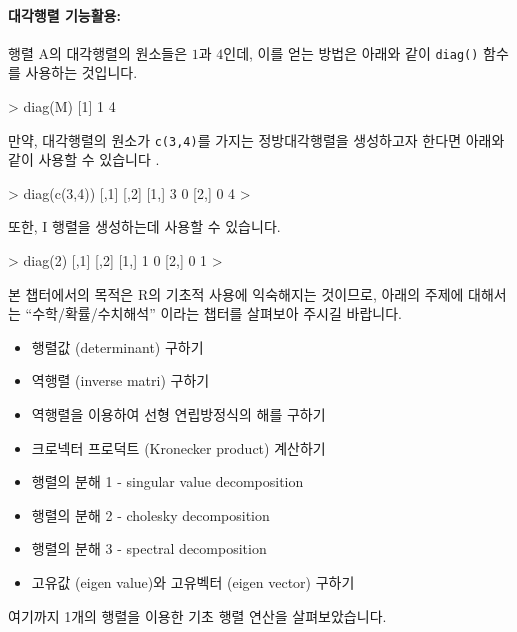\paragraph{대각행렬 기능활용: } 행렬 A의 대각행렬의 원소들은 $1$과 $4$인데, 이를 얻는 방법은 아래와 같이 \texttt{diag()} 함수를 사용하는 것입니다. 

\begin{Schunk}
\begin{Soutput}
> diag(M)
[1] 1 4
\end{Soutput}
\end{Schunk}

만약, 대각행렬의 원소가 \texttt{c(3,4)}를 가지는 정방대각행렬을 생성하고자 한다면 아래와 같이 사용할 수 있습니다 .

\begin{Schunk}
\begin{Soutput}
> diag(c(3,4))
     [,1] [,2]
[1,]    3    0
[2,]    0    4
> 
\end{Soutput}
\end{Schunk}

또한, I 행렬을 생성하는데 사용할 수 있습니다. 

\begin{Schunk}
\begin{Soutput}
> diag(2)
     [,1] [,2]
[1,]    1    0
[2,]    0    1
>
\end{Soutput}
\end{Schunk}

본 챕터에서의 목적은 R의 기초적 사용에 익숙해지는 것이므로, 아래의 주제에 대해서는 ``수학/확률/수치해석'' 이라는 챕터를 살펴보아 주시길 바랍니다.
\begin{itemize}
	\item 행렬값 (determinant) 구하기 
	\item 역행렬 (inverse matri) 구하기 
	\item 역행렬을 이용하여 선형 연립방정식의 해를 구하기
	\item 크로넥터 프로덕트 (Kronecker product) 계산하기 
	\item 행렬의 분해 1 - singular value decomposition 
	\item 행렬의 분해 2 - cholesky decomposition 
	\item 행렬의 분해 3 - spectral decomposition
	\item 고유값 (eigen value)와 고유벡터 (eigen vector) 구하기  
\end{itemize}

여기까지 1개의 행렬을 이용한 기초 행렬 연산을 살펴보았습니다. 

